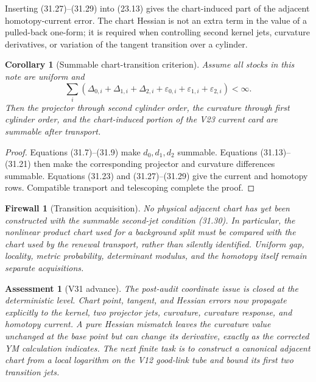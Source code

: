 \documentclass[11pt]{article}
\newtheorem{corollary}[theorem]{Corollary}
\newtheorem{assessment}[theorem]{Assessment}
\newtheorem{firewall}[theorem]{Firewall}
\begin{document}
Inserting (31.27)--(31.29) into (23.13) gives the chart-induced part of
the adjacent homotopy-current error.  The chart Hessian is not an extra
term in the value of a pulled-back one-form; it is required when
controlling second kernel jets, curvature derivatives, or variation of
the tangent transition over a cylinder.

\begin{corollary}[Summable chart-transition criterion]
\label{cor:v11v31-summable-chart}
Assume all stocks in this note are uniform and
\[
 \sum_i
 \left(
 \Delta_{0,i}+\Delta_{1,i}+\Delta_{2,i}
 +\varepsilon_{0,i}+\varepsilon_{1,i}+\varepsilon_{2,i}
 \right)<\infty.
 \tag{31.30}
\]
Then the projector through second cylinder order, the curvature through
first cylinder order, and the chart-induced portion of the V23 current
card are summable after transport.
\end{corollary}

\begin{proof}
Equations (31.7)--(31.9) make \(d_0,d_1,d_2\) summable.
Equations (31.13)--(31.21) then make the corresponding projector and
curvature differences summable.  Equations (31.23) and
(31.27)--(31.29) give the current and homotopy rows.  Compatible
transport and telescoping complete the proof.
\end{proof}

\begin{firewall}[Transition acquisition]
\label{fw:v11v31-transition}
No physical adjacent chart has yet been constructed with the summable
second-jet condition (31.30).  In particular, the nonlinear product
chart used for a background split must be compared with the chart used
by the renewal transport, rather than silently identified.  Uniform
gap, locality, metric probability, determinant modulus, and the
homotopy itself remain separate acquisitions.
\end{firewall}

\begin{assessment}[V31 advance]
\label{ass:v11v31}
The post-audit coordinate issue is closed at the deterministic level.
Chart point, tangent, and Hessian errors now propagate explicitly to
the kernel, two projector jets, curvature, curvature response, and
homotopy current.  A pure Hessian mismatch leaves the curvature value
unchanged at the base point but can change its derivative, exactly as
the corrected YM calculation indicates.  The next finite task is to
construct a canonical adjacent chart from a local logarithm on the
V12 good-link tube and bound its first two transition jets.
\end{assessment}
\end{document}
